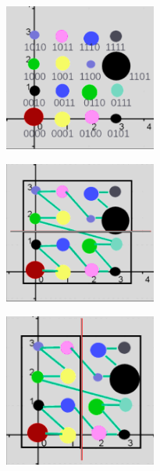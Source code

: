 \documentclass[11pt,a4paper]{article}
\begin{document}
\begin{figure}[H]	
     \centering
     \begin{subfigure}[b]{0.475\textwidth}
         \centering
         \captionsetup{justification=centering}
         \includegraphics[width=5cm]{images/example_lbvh/morton_g.png}
         \caption{}
         \label{fig:pi_4000}
     \end{subfigure}
     \hfill
     \begin{subfigure}[b]{0.475\textwidth}
         \centering
         \captionsetup{justification=centering}
         \includegraphics[width=5cm]{images/example_lbvh/01_g.png}
         \caption{}
         \label{fig:pi_5000}
     \end{subfigure}
     \hfill
     \begin{subfigure}[b]{0.475\textwidth}
         \centering
         \captionsetup{justification=centering}
         \includegraphics[width=5cm]{images/example_lbvh/02_g.png}
         \caption{}
         \label{fig:pi_18000}
     \end{subfigure}
        \captionsetup{justification=centering,margin=2cm}

\end{figure}
\end{document}
